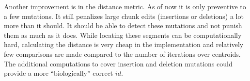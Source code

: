 Another improvement is in the distance metric. As of now it is only preventive
to a few mutations. It still penalizes large chunk edits (insertions or
deletions) a lot more than it should. It should be able to detect these
mutations and not punish them as much as it does. While locating these segments
can be computationally hard, calculating the distance is very cheap in the
implementation and relatively few comparisons are made compared to the number
of iterations over centroids. The additional computations to cover insertion
and deletion mutations could provide a more ``biologically'' correct $id$.

%

